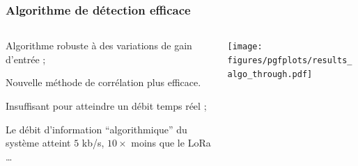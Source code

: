 \documentclass[../main.tex]{subfiles}
\begin{document}
\begin{frame}
  \frametitle{Algorithme de détection efficace}
  \begin{columns}
    \begin{column}{.5\linewidth}
      \begin{ctrlitemize}{.5 em}
        \item Algorithme robuste à des variations de gain d'entrée ;
        \item Nouvelle méthode de corrélation plus efficace\footnotemark.
      \end{ctrlitemize} \vspace{1 em}

      \begin{ctrlitemize}{.5 em}
        \item Insuffisant pour atteindre un débit temps réel ;
        \item Le débit d'information ``algorithmique'' du système atteint $5$ kb/s, $10\times$ moins que le LoRa \dots
      \end{ctrlitemize}
    \end{column}
    \begin{column}{.4\linewidth}
      \centering
      \texttt{[image: figures/pgfplots/results\_algo\_through.pdf]}
    \end{column}
  \end{columns} \vspace{-1 em}
\end{frame}
\end{document}
